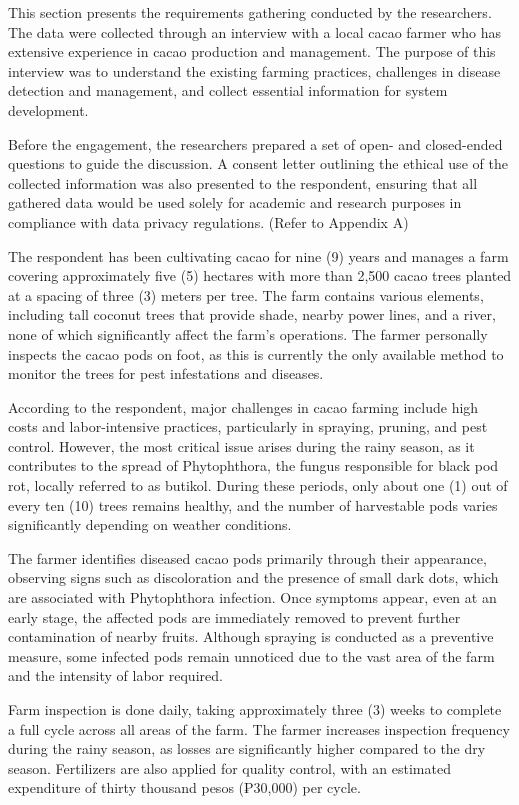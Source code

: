This section presents the requirements gathering conducted by the researchers. The data were collected through an interview with a local cacao farmer who has extensive experience in cacao production and management. The purpose of this interview was to understand the existing farming practices, challenges in disease detection and management, and collect essential information for system development. 

Before the engagement, the researchers prepared a set of open- and closed-ended questions to guide the discussion. A consent letter outlining the ethical use of the collected information was also presented to the respondent, ensuring that all gathered data would be used solely for academic and research purposes in compliance with data privacy regulations. (Refer to Appendix A) 

The respondent has been cultivating cacao for nine (9) years and manages a farm covering approximately five (5) hectares with more than 2,500 cacao trees planted at a spacing of three (3) meters per tree. The farm contains various elements, including tall coconut trees that provide shade, nearby power lines, and a river, none of which significantly affect the farm’s operations. The farmer personally inspects the cacao pods on foot, as this is currently the only available method to monitor the trees for pest infestations and diseases.

According to the respondent, major challenges in cacao farming include high costs and labor-intensive practices, particularly in spraying, pruning, and pest control. However, the most critical issue arises during the rainy season, as it contributes to the spread of Phytophthora, the fungus responsible for black pod rot, locally referred to as butikol. During these periods, only about one (1) out of every ten (10) trees remains healthy, and the number of harvestable pods varies significantly depending on weather conditions.

The farmer identifies diseased cacao pods primarily through their appearance, observing signs such as discoloration and the presence of small dark dots, which are associated with Phytophthora infection. Once symptoms appear, even at an early stage, the affected pods are immediately removed to prevent further contamination of nearby fruits. Although spraying is conducted as a preventive measure, some infected pods remain unnoticed due to the vast area of the farm and the intensity of labor required.

Farm inspection is done daily, taking approximately three (3) weeks to complete a full cycle across all areas of the farm. The farmer increases inspection frequency during the rainy season, as losses are significantly higher compared to the dry season. Fertilizers are also applied for quality control, with an estimated expenditure of thirty thousand pesos (₱30,000) per cycle.

